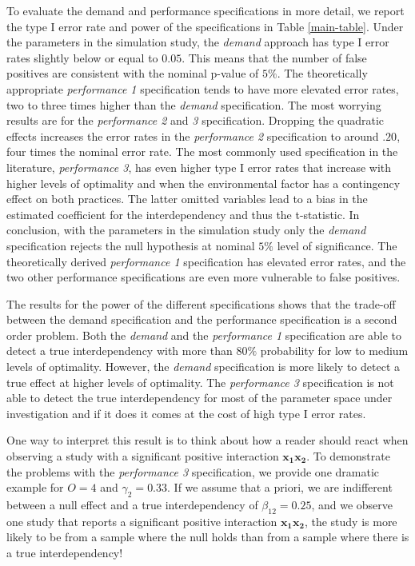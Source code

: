 \documentclass[12pt]{article}
\begin{document}
To evaluate the demand and performance specifications in more detail, we report the type I error rate and power of the specifications in Table \ref{main-table}. Under the parameters in the simulation study, the \emph{demand} approach has type I error rates slightly below or equal to $0.05$. This means that the number of false positives are consistent with the nominal p-value of $5\%$. The theoretically appropriate \emph{performance 1} specification tends to have more elevated error rates, two to three times higher than the \emph{demand} specification. The most worrying results are for the \emph{performance 2} and \emph{3} specification. Dropping the quadratic effects increases the error rates in the \emph{performance 2} specification to around $.20$, four times the nominal error rate. The most commonly used specification in the literature, \emph{performance 3}, has even higher type I error rates that increase with higher levels of optimality and when the environmental factor has a contingency effect on both practices. The latter omitted variables lead to a bias in the estimated coefficient for the interdependency and thus the t-statistic. In conclusion, with the parameters in the simulation study only the \emph{demand} specification rejects the null hypothesis at nominal $5\%$ level of significance. The theoretically derived \emph{performance 1} specification has elevated error rates, and the two other performance specifications are even more vulnerable to false positives.

The results for the power of the different specifications shows that the trade-off between the demand specification and the performance specification is a second order problem. Both the \emph{demand} and the \emph{performance 1} specification are able to detect a true interdependency with more than $80\%$ probability for low to medium levels of optimality. However, the \emph{demand} specification is more likely to detect a true effect at higher levels of optimality. The \emph{performance 3} specification is not able to detect the true interdependency for most of the parameter space under investigation and if it does it comes at the cost of high type I error rates.

One way to interpret this result is to think about how a reader should react when observing a study with a significant positive interaction \(\mathbf{x_1 x_2}\). To demonstrate the problems with the \emph{performance 3} specification, we provide one dramatic example for \(O = 4\) and \(\gamma_2 = 0.33\). If we assume that a priori, we are indifferent between a null effect and a true interdependency of \(\beta_{12} = 0.25\), and we observe one study that reports a significant positive interaction \(\mathbf{x_{1} x_{2}}\), the study is more likely to be from a sample where the null holds than from a sample where there is a true interdependency!
\end{document}
